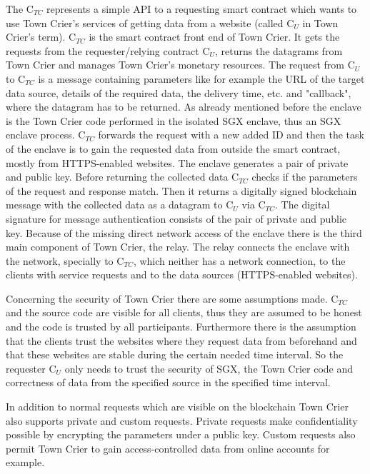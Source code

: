 \documentclass[conference]{IEEEtran}
\begin{document}
The C$_{TC}$ represents a simple API to a requesting smart contract which wants to use Town Crier's services of getting data from a website (called C$_{U}$ in Town Crier's term). C$_{TC}$ is the smart contract front end of Town Crier. It gets the requests from the requester/relying contract C$_{U}$, returns the datagrams from Town Crier and manages Town Crier's monetary resources. The request from C$_{U}$ to C$_{TC}$ is a message containing parameters like for example the URL of the target data source, details of the required data, the delivery time, etc. and "callback", where the datagram has to be returned. As already mentioned before the enclave is the Town Crier code performed in the isolated SGX enclave, thus an SGX enclave process. C$_{TC}$ forwards the request with a new added ID and then the task of the enclave is to gain the requested data from outside the smart contract, mostly from HTTPS-enabled websites. The enclave generates a pair of private and public key. Before returning the collected data C$_{TC}$ checks if the parameters of the request and response match. Then it returns a digitally signed blockchain message with the collected data as a datagram to C$_{U}$ via C$_{TC}$. The digital signature for message authentication consists of the pair of private and public key. Because of the missing direct network access of the enclave there is the third main component of Town Crier, the relay. The relay connects the enclave with the network, specially to C$_{TC}$, which neither has a network connection, to the clients with service requests and to the data sources (HTTPS-enabled websites). \cite{Zhang2016} \par 
Concerning the security of Town Crier there are some assumptions made. C$_{TC}$ and the source code are visible for all clients, thus they are assumed to be honest and the code is trusted by all participants. Furthermore there is the assumption that the clients trust the websites where they request data from beforehand and that these websites are stable during the certain needed time interval. So the requester C$_{U}$ only needs to trust the security of SGX, the Town Crier code and correctness of data from the specified source in the specified time interval. \cite{Zhang2016} \par 
In addition to normal requests which are visible on the blockchain Town Crier also supports private and custom requests. Private requests make confidentiality possible by encrypting the parameters under a public key. Custom requests also permit Town Crier to gain access-controlled data from online accounts for example. \cite{Zhang2016} \par 
\end{document}
